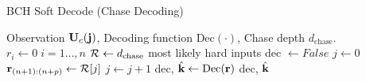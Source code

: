 \begin{algorithm}
   \caption{BCH Soft Decode (Chase Decoding)}
   \label{alg:bch-soft}
\begin{algorithmic}[1]
    Observation $\mathbf U_c(\mathbf j)$, Decoding function $\mathrm{Dec}(\cdot)$, Chase depth $d_{\text{chase}}$.
   \State $r_i \gets 0 \; i=1\dotsc, n$
   \State $\mathcal R \gets d_{\text{chase}}$ most likely hard inputs 
   \State dec $\gets False$
   \State $j \gets 0$
        \State $\mathbf r_{(n+1):(n+p)} \gets \mathcal R [j]$
        \State $j \gets j+1$
        \State dec, $ \hat{\mathbf k} \gets \mathrm{Dec}(\mathbf r)$
   \EndWhile
     dec, $\hat{\mathbf k}$ 
\end{algorithmic}
\end{algorithm}

